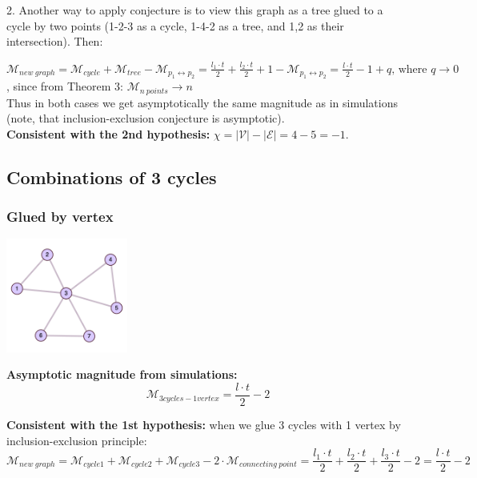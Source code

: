 \documentclass{article}
\begin{document}
2.
Another way to apply conjecture is to view this graph as a tree glued to a cycle
by two points (1-2-3 as a cycle, 1-4-2 as a tree, and 1,2 as their intersection). Then:

$\mathcal{M}_{new \ graph} = \mathcal{M}_{cycle} + \mathcal{M}_{tree}
- \mathcal{M}_{p_1 \leftrightarrow p_2} = \frac{l_1 \cdot t}{2} + \frac{l_2 \cdot t}{2} + 1 - 
\mathcal{M}_{p_1 \leftrightarrow p_2} = \frac{l \cdot t}{2} - 1 + q \text{, where } q \rightarrow 0$,
since from Theorem 3: $\mathcal{M}_{n \ points} \rightarrow n$ 
\\

Thus in both cases we get asymptotically the same magnitude as in simulations (note, 
that inclusion-exclusion conjecture is asymptotic). 
\\

\textbf{Consistent with the 2nd hypothesis:} $\chi = |\mathcal{V}| - |\mathcal{E}| = 4 - 5 = -1$.

\subsection{Combinations of 3 cycles}

\subsubsection{Glued by vertex}

\begin{center}
\includegraphics[width=0.3\textwidth]{flower_exp}
\end{center}

\textbf{Asymptotic magnitude from simulations:}
\\

$$\mathcal{M}_{3cycles-1vertex} = \frac{l \cdot t}{2} - 2$$


\textbf{Consistent with the 1st hypothesis:} when we glue 3 cycles with 1 vertex by inclusion-exclusion
principle: $$\mathcal{M}_{new \ graph} = \mathcal{M}_{cycle1} + \mathcal{M}_{cycle2} + \mathcal{M}_{cycle3}
- 2 \cdot \mathcal{M}_{connecting \ point} = \frac{l_1 \cdot t}{2} + \frac{l_2 \cdot t}{2} + \frac{l_3 \cdot t}{2} - 2
= \frac{l \cdot t}{2} - 2$$ 
\end{document}
